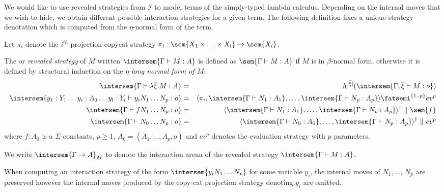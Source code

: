 We would like to use revealed strategies from $\mathcal{I}$ to model terms of
the simply-typed lambda calculus.
Depending on the internal moves that we wish to hide, we obtain different possible interaction strategies for a given term.
The following definition fixes a unique strategy denotation which is computed from the $\eta$-normal form of the term.

\begin{definition}
\label{dfn:interactionstrategy_ofterms}
Let $\pi_i$ denote the $i^{th}$ projection copycat strategy $\pi_i : \sem{X_1 \times \ldots \times X_l} \rightarrow \sem{X_i}$.

The  or \emph{revealed strategy} of
$M$ written $\intersem{\Gamma \vdash M : A}$ is defined as
$\sem{\Gamma \vdash M : A}$ if $M$ is in $\beta$-normal form, otherwise
it is defined by structural induction on the \emph{$\eta$-long normal form of $M$}:
\begin{eqnarray*}
\intersem{\Gamma \vdash \lambda \overline{\xi} . M  : A} &=& \Lambda^{|\overline{\xi}|}(\intersem{\Gamma, \overline{\xi} \vdash M : o })  \\
\intersem{y_1 : Y_1 \ldots y_i : A_0 \ldots y_l : Y_l \vdash y_i N_1 \ldots N_p :o} &=& \langle \pi_i, \intersem{\Gamma \vdash N_1 : A_1}, \ldots, \intersem{\Gamma \vdash N_p : A_p}  \rangle \fatsemi ^{\{1..p\}} ev^p \\
\intersem{\Gamma \vdash f N_1 \ldots N_p : o} &=& \langle \intersem{\Gamma \vdash N_1 : A_1}, \ldots, \intersem{\Gamma \vdash N_p : A_p} \rangle^\dagger\  \|\ \sem{f} \\
\intersem{\Gamma \vdash N_0 \ldots N_p : o} &=& \langle \intersem{\Gamma \vdash N_0 : A_0}, \ldots, \intersem{\Gamma \vdash N_p : A_p}  \rangle^\dagger\ \|\ ev^p
\end{eqnarray*}
where
$f : A_0$ is a
 $\Sigma$-constants, $p\geq 1$, $A_0 =
(A_1,\ldots,A_p,o)$ and $ev^p$ denotes the evaluation strategy with
$p$ parameters.

We write $\intersem{\Gamma \rightarrow A}_M$ to denote the
interaction arena of the revealed strategy $\intersem{\Gamma \vdash
M : A}$.
\end{definition}

\begin{remark}
When computing an interaction strategy of the form
$\intersem{y_i N_1 \ldots N_p}$ for some variable $y_i$, the
internal moves of $N_1$, \ldots, $N_p$ are preserved however the
internal moves produced by the copy-cat projection strategy denoting
$y_i$ are omitted.
\end{remark}

